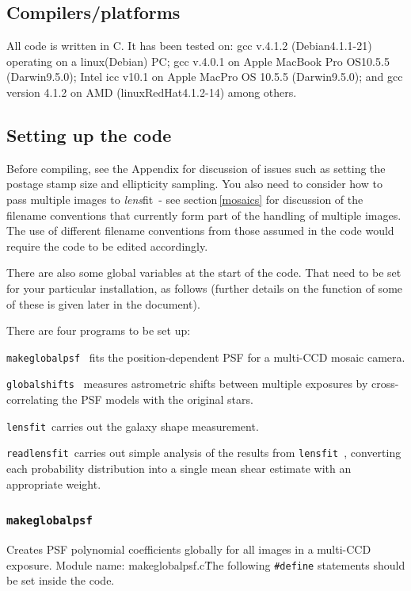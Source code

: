 \documentclass{article}
\def\lensfit{{\tt lensfit}\ }
\def\globalshifts{{\tt globalshifts}\ }
\def\makeglobalpsf{{\tt makeglobalpsf}\ }
\def\lensfitsuite{{\em lens}fit\ }
\def\readlensfit{{\tt readlensfit}\ }
\begin{document}
\subsection{Compilers/platforms}
All code is written in C. It has been tested on: gcc v.4.1.2 (Debian4.1.1-21) 
operating on a linux(Debian) PC; 
gcc v.4.0.1 on Apple MacBook Pro OS10.5.5 (Darwin9.5.0); 
Intel icc v10.1 on Apple MacPro OS 10.5.5 (Darwin9.5.0); 
and gcc version 4.1.2 on AMD (linuxRedHat4.1.2-14) among others.

\subsection{Setting up the code}\label{settingup}
Before compiling, see the Appendix for discussion of issues such as setting the postage stamp size and 
ellipticity sampling. You also need to consider how to pass multiple images to \lensfitsuite - see 
section\,\ref{mosaics} for discussion of the filename conventions that currently form part of the
handling of multiple images.  The use of different filename conventions from those assumed in the code 
would require the code to be edited accordingly.

There are also some global variables at the start of the code. That need to be set for 
your particular installation, as follows (further details on the function of some of these is given later
in the document). 

There are four programs to be set up:
\begin{list}{}{\itemsep=0mm \leftmargin=5mm}
\item {\makeglobalpsf} fits the position-dependent PSF for a multi-CCD mosaic camera. 
\item {\globalshifts} measures astrometric shifts between multiple exposures by cross-correlating the PSF
models with the original stars.
\item \lensfit carries out the galaxy shape measurement. 
\item \readlensfit carries out simple analysis of the results from \lensfit, converting each probability 
distribution into a single mean shear estimate with an appropriate weight. 
\end{list}

\subsubsection{\makeglobalpsf}
Creates PSF polynomial coefficients globally for all images in a multi-CCD exposure. Module name: 
makeglobalpsf.c\. The following {\tt \#define} statements should be set inside the code.  
\end{document}
